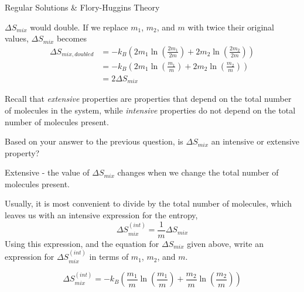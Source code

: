 \begin{activity}{Regular Solutions \& Flory-Huggins Theory}
\begin{ctqs}
\begin{solution}[1in]{}
			$\Delta S_{mix}$ would double.  If we replace $m_1$, $m_2$, and $m$ with twice their original values, $\Delta S_{mix}$ becomes
			\vspace{-6pt}
			\begin{align*}
				\Delta S_{mix,doubled} &= -k_B\left(2m_1 \ln\left(\frac{2m_1}{2m}\right) + 2m_2 \ln\left(\frac{2m_2}{2m}\right) \right)\\
				 &= -k_B\left(2m_1 \ln\left(\frac{m_1}{m}\right) + 2m_2 \ln\left(\frac{m_2}{m}\right) \right)\\
				 &= 2\Delta S_{mix}
			\end{align*}
		\end{solution}
	
	
	\question Recall that \emph{extensive} properties are properties that depend on the total number of molecules in the system, while \emph{intensive} properties do not depend on the total number of molecules present.
	
	Based on your answer to the previous question, is $\Delta S_{mix}$ an intensive or extensive property?
	
		\begin{solution}[0.5in]{}
		
			Extensive - the value of $\Delta S_{mix}$ changes when we change the total number of molecules present.
		
		\end{solution}
	
	\question Usually, it is most convenient to divide by the total number of molecules, which leaves us with an intensive expression for the entropy, 
		\begin{equation*}
			\Delta S_{mix}^{(int)} = \frac{1}{m} \Delta S_{mix}
		\end{equation*}
		Using this expression, and the equation for $\Delta S_{mix}$ given above, write an expression for $\Delta S_{mix}^{(int)}$ in terms of $m_1$, $m_2$, and $m$.
		
			\begin{solution}[1in]{}
			
				\begin{equation*}
					\Delta S_{mix}^{(int)} = -k_B\left(\frac{m_1}{m} \ln\left(\frac{m_1}{m}\right) + \frac{m_2}{m} \ln\left(\frac{m_2}{m}\right) \right)
				\end{equation*}
			\end{solution}
		

\end{ctqs}
\end{activity}

